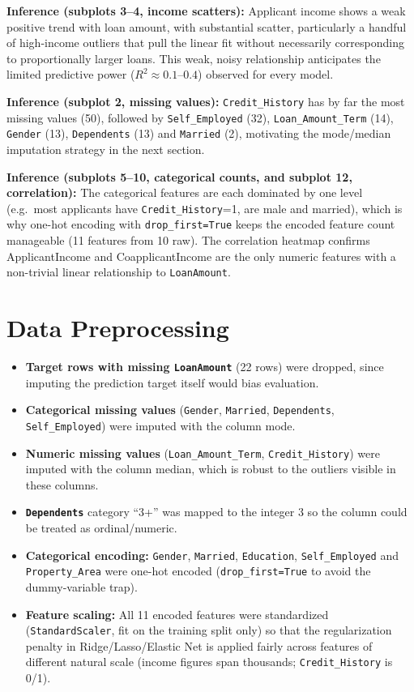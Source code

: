 \documentclass[12pt,a4paper]{article}
\begin{document}
\textbf{Inference (subplots 3--4, income scatters):} Applicant income shows a weak
positive trend with loan amount, with substantial scatter, particularly a handful of
high-income outliers that pull the linear fit without necessarily corresponding to
proportionally larger loans. This weak, noisy relationship anticipates the limited
predictive power ($R^2 \approx 0.1$--$0.4$) observed for every model.

\textbf{Inference (subplot 2, missing values):} \texttt{Credit\_History} has by far the
most missing values (50), followed by \texttt{Self\_Employed} (32), \texttt{Loan\_Amount\_Term}
(14), \texttt{Gender} (13), \texttt{Dependents} (13) and \texttt{Married} (2), motivating
the mode/median imputation strategy in the next section.

\textbf{Inference (subplots 5--10, categorical counts, and subplot 12, correlation):} The
categorical features are each dominated by one level (e.g.\ most applicants have
\texttt{Credit\_History}=1, are male and married), which is why one-hot encoding with
\texttt{drop\_first=True} keeps the encoded feature count manageable (11 features from 10
raw). The correlation heatmap confirms ApplicantIncome and CoapplicantIncome are the only
numeric features with a non-trivial linear relationship to \texttt{LoanAmount}.

\section{Data Preprocessing}
\begin{itemize}
\item \textbf{Target rows with missing \texttt{LoanAmount}} (22 rows) were dropped, since
imputing the prediction target itself would bias evaluation.
\item \textbf{Categorical missing values} (\texttt{Gender}, \texttt{Married},
\texttt{Dependents}, \texttt{Self\_Employed}) were imputed with the column mode.
\item \textbf{Numeric missing values} (\texttt{Loan\_Amount\_Term}, \texttt{Credit\_History})
were imputed with the column median, which is robust to the outliers visible in these
columns.
\item \textbf{\texttt{Dependents}} category ``3+'' was mapped to the integer 3 so the
column could be treated as ordinal/numeric.
\item \textbf{Categorical encoding:} \texttt{Gender}, \texttt{Married}, \texttt{Education},
\texttt{Self\_Employed} and \texttt{Property\_Area} were one-hot encoded
(\texttt{drop\_first=True} to avoid the dummy-variable trap).
\item \textbf{Feature scaling:} All 11 encoded features were standardized
(\texttt{StandardScaler}, fit on the training split only) so that the regularization
penalty in Ridge/Lasso/Elastic Net is applied fairly across features of different
natural scale (income figures span thousands; \texttt{Credit\_History} is 0/1).
\end{itemize}
\end{document}
